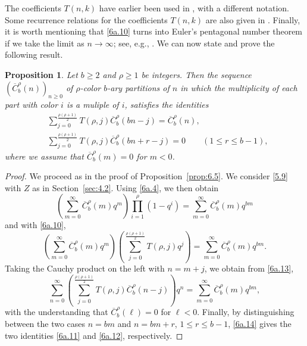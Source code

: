 \documentclass{amsart}
\theoremstyle{plain}
\newtheorem{proposition}[theorem]{Proposition}
\numberwithin{equation}{section}
\begin{document}
\bigskip
The coefficients $T(n,k)$ have earlier been used in \cite[Theorem~1.3]{MS}, 
with a different notation. Some recurrence relations for the coefficients 
$T(n,k)$ are also given in \cite{MS}. Finally,
it is worth mentioning that \eqref{6a.10} turns into Euler's pentagonal number 
theorem if we take the limit as $n\to\infty$; see, e.g., \cite[pp.~311 ff.]{Ap}.
We can now state and prove the following result. 

\begin{proposition}\label{prop:6.15}
Let $b\geq 2$ and $\rho\geq 1$ be integers. Then the sequence
$\left(\overline{C}_b^\rho(n)\right)_{n\geq 0}$ of $\rho$-color $b$-ary 
partitions of $n$ in which the multiplicity of each part with color $i$ is a 
muliple of $i$, satisfies the identities
\begin{align}
&\sum_{j=0}^{\frac{\rho(\rho+1)}{2}}T(\rho,j)\overline{C}_b^\rho(bn-j)
=\overline{C}_b^\rho(n),\label{6a.11}\\
&\sum_{j=0}^{\frac{\rho(\rho+1)}{2}}T(\rho,j)\overline{C}_b^\rho(bn+r-j)
= 0 \qquad (1\leq r\leq b-1),\label{6a.12}
\end{align}
where we assume that $\overline{C}_b^\rho(m)=0$ for $m<0$.
\end{proposition}

\begin{proof}
We proceed as in the proof of Proposition~\ref{prop:6.5}. We consider 
\eqref{5.9} with $Z$ as in Section~\ref{sec:4.2}. Using \eqref{6a.4}, we then
obtain
\[
\left(\sum_{m=0}^\infty\overline{C}_b^\rho(m)q^m\right)
\prod_{i=1}^\rho\left(1-q^i\right)
= \sum_{m=0}^\infty\overline{C}_b^\rho(m)q^{bm}
\]
and with \eqref{6a.10},
\begin{equation}\label{6a.13}
\left(\sum_{m=0}^\infty\overline{C}_b^\rho(m)q^m\right)
\left(\sum_{j=0}^{\frac{\rho(\rho+1)}{2}}T(\rho,j)q^j\right)
= \sum_{m=0}^\infty\overline{C}_b^\rho(m)q^{bm}.
\end{equation}
Taking the Cauchy product on the left with $n=m+j$, we obtain from 
\eqref{6a.13},
\begin{equation}\label{6a.14}
\sum_{n=0}^\infty\left(\sum_{j=0}^{\frac{\rho(\rho+1)}{2}}T(\rho,j)
\overline{C}_b^\rho(n-j)\right)q^n
= \sum_{m=0}^\infty\overline{C}_b^\rho(m)q^{bm},
\end{equation}
with the understanding that $\overline{C}_b^\rho(\ell)=0$ for $\ell< 0$. 
Finally, by distinguishing between the two cases $n=bm$ and $n=bm+r$,
$1\leq r\leq b-1$, \eqref{6a.14} gives the two identities \eqref{6a.11}
and \eqref{6a.12}, respectively.
\end{proof}
\end{document}
